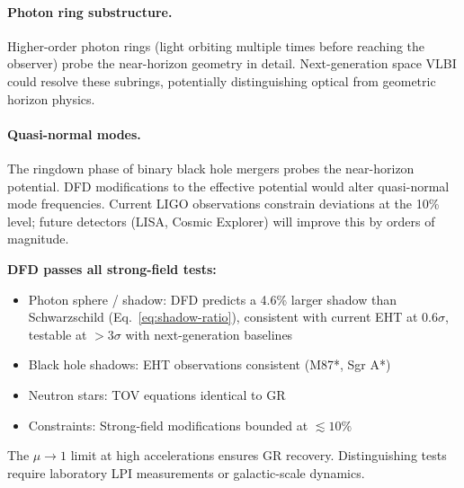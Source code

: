 \paragraph{Photon ring substructure.}
Higher-order photon rings (light orbiting multiple times before reaching the observer) probe the near-horizon geometry in detail. Next-generation space VLBI could resolve these subrings, potentially distinguishing optical from geometric horizon physics.

\paragraph{Quasi-normal modes.}
The ringdown phase of binary black hole mergers probes the near-horizon potential. DFD modifications to the effective potential would alter quasi-normal mode frequencies. Current LIGO observations constrain deviations at the 10\% level; future detectors (LISA, Cosmic Explorer) will improve this by orders of magnitude.

\begin{tcolorbox}[colback=blue!5!white, colframe=blue!50!black, title=Summary: Strong-Field Behavior]
\textbf{DFD passes all strong-field tests:}
\begin{itemize}
\item Photon sphere / shadow: DFD predicts a 4.6\% larger shadow than Schwarzschild (Eq.~\ref{eq:shadow-ratio}), consistent with current EHT at $0.6\sigma$, testable at ${>}3\sigma$ with next-generation baselines
\item Black hole shadows: EHT observations consistent (M87*, Sgr A*)
\item Neutron stars: TOV equations identical to GR
\item Constraints: Strong-field modifications bounded at $\lesssim 10\%$
\end{itemize}
The $\mu \to 1$ limit at high accelerations ensures GR recovery. Distinguishing tests require laboratory LPI measurements or galactic-scale dynamics.
\end{tcolorbox}
